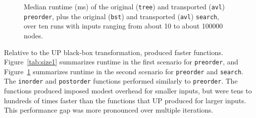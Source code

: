 \begin{figure}
\small
{}
\caption{Median runtime (ms) of the original (\lstinline{tree}) and transported (\lstinline{avl}) \lstinline{preorder},
plus the original (\lstinline{bst}) and transported (\lstinline{avl}) \lstinline{search}, over ten runs with inputs ranging from about 10 to about 100000 nodes.}
\label{tab:size2}
\end{figure}

Relative to the UP black-box transformation, \toolnamec produced faster functions.
Figure~\ref{tab:size1} summarizes
runtime in the first scenario for \lstinline{preorder},
and Figure~\ref{tab:size2} summarizes
runtime in the second scenario for \lstinline{preorder} and \lstinline{search}.
The \lstinline{inorder} and \lstinline{postorder} functions performed similarly to \lstinline{preorder}.
The functions \toolnamec produced imposed modest overhead for smaller inputs, but were
tens to hundreds of times faster than the functions that UP produced for larger inputs.
This performance gap was more pronounced over multiple iterations.


